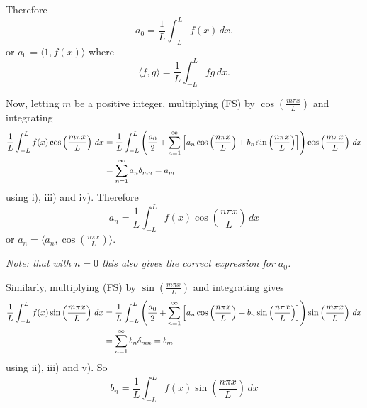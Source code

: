 \documentclass[10pt, a4paper]{article}
\begin{document}
Therefore
\[
a_0 = \frac{1}{L}\int_{-L}^{L}f(x)\,dx.
\]
or $a_0 = \langle 1, f(x) \rangle$ where
\[
\langle f, g \rangle = \frac{1}{L}\int_{-L}^{L}fg\,dx.
\]

Now,
letting $m$ be a positive integer,
multiplying (FS) by $\cos\left(\frac{m\pi x}{L}\right)$ and integrating
\begin{align*}
    \frac{1}{L}\int_{-L}^{L}f(x)\cos\left(\frac{m\pi x}{L}\right)\,dx &= \frac{1}{L}\int_{-L}^{L}\left(\frac{a_0}{2} + \infsum[n = 1]\left[a_n\cos\left(\frac{n\pi x}{L}\right) + b_n\sin\left(\frac{n\pi x}{L}\right)\right]\right)\cos\left(\frac{m\pi x}{L}\right)\,dx \\
    &= \infsum[n = 1]a_n\delta_{mn} = a_m
\end{align*}
using i),
iii) and iv).
Therefore 
\[
a_n = \frac{1}{L}\int_{-L}^{L}f(x)\cos\left(\frac{n\pi x}{L}\right)\,dx
\]
or $a_n = \langle a_n, \cos\left(\frac{n\pi x}{L}\right) \rangle$.

\textit{Note: that with $n = 0$ this also gives the correct expression for $a_0$.}

Similarly,
multiplying (FS) by $\sin\left(\frac{m\pi x}{L}\right)$ and integrating gives
\begin{align*}
    \frac{1}{L}\int_{-L}^{L}f(x)\sin\left(\frac{m\pi x}{L}\right)\,dx &= \frac{1}{L}\int_{-L}^{L}\left(\frac{a_0}{2} + \infsum[n = 1]\left[a_n\cos\left(\frac{n\pi x}{L}\right) + b_n\sin\left(\frac{n\pi x}{L}\right)\right]\right)\sin\left(\frac{m\pi x}{L}\right)\,dx \\
    &= \infsum[n = 1]b_n\delta_{mn} = b_m
\end{align*}
using ii),
iii) and v).
So
\[
b_n = \frac{1}{L}\int_{-L}^{L}f(x)\sin\left(\frac{n\pi x}{L}\right)\,dx
\]
\end{document}
